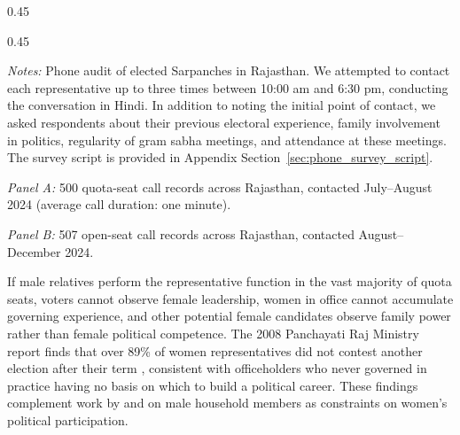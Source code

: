 \documentclass[12pt]{article}
\begin{document}
\begin{table}[!htbp]
    \centering
    \caption{Phone Audit Response Distribution}
    \label{tab:full_survey}
    \setlength{\tabcolsep}{4pt}

    \begin{subtable}[t]{0.45\linewidth}
        \centering\scriptsize
        \caption*{\textbf{Panel A: Gender-Quota Seats}}
        
    \end{subtable}
    \hspace{2em}
    \begin{subtable}[t]{0.45\linewidth}
        \centering\scriptsize
        \caption*{\textbf{Panel B: Open Seats}}
        
    \end{subtable}

    \vspace{\medskipamount}

    \parbox{0.9\textwidth}{\scriptsize
        \emph{Notes:} Phone audit of elected Sarpanches in Rajasthan. We attempted to contact each representative up to three times between 10:00 am and 6:30 pm, conducting the conversation in Hindi. In addition to noting the initial point of contact, we asked respondents about their previous electoral experience, family involvement in politics, regularity of gram sabha meetings, and attendance at these meetings. The survey script is provided in Appendix Section~\ref{sec:phone_survey_script}.

        \medskip

        \emph{Panel A:} 500 quota-seat call records across Rajasthan, contacted July--August 2024 (average call duration: one minute).

        \medskip

        \emph{Panel B:} 507 open-seat call records across Rajasthan, contacted August--December 2024.
    }
\end{table}

If male relatives perform the representative function in the vast majority of quota seats, voters cannot observe female leadership, women in office cannot accumulate governing experience, and other potential female candidates observe family power rather than female political competence. The 2008 Panchayati Raj Ministry report finds that over 89\% of women representatives did not contest another election after their term \citep[pp.~26, 63]{ministry2008}, consistent with officeholders who never governed in practice having no basis on which to build a political career. These findings complement work by \citet{cheema2020canvassing, khan2021count, prillaman2023strength} and \citet{kumar2024} on male household members as constraints on women's political participation.
\end{document}

